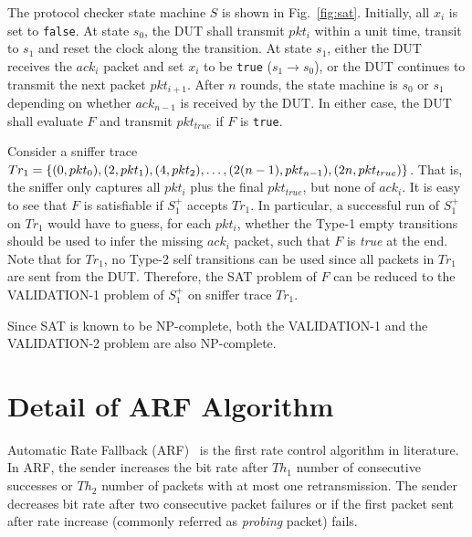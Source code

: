 The protocol checker state machine $S$ is shown in Fig.~\ref{fig:sat}.
%
Initially, all $x_i$ is set to \texttt{false}.
%
At state $s_0$, the DUT shall transmit $pkt_i$ within a unit time, transit to
$s_1$ and reset the clock along the transition.
At state $s_1$, either the DUT receives the $ack_i$ packet and
set $x_i$ to be \texttt{true} ($s_1 \rightarrow s_0$), or the DUT continues to
transmit the next packet $pkt_{i+1}$.
%
After $n$ rounds, the state machine is $s_0$ or $s_1$ depending on whether
$ack_{n-1}$ is received by the DUT.
%
In either case, the DUT shall evaluate $F$ and transmit $pkt_{true}$ if $F$ is
\texttt{true}.  

Consider a sniffer trace $Tr_1=\{(0, pkt_0), (2, pkt_1),\\ (4,
pkt_2),\ldots, (2(n-1), pkt_{n-1}), (2n, pkt_{true})\}$.
%
That is, the sniffer only captures all $pkt_i$ plus the final $pkt_{true}$, but none of
$ack_i$.
%
It is easy to see that $F$ is satisfiable if $S_1^+$ accepts
$Tr_1$.
%
In particular, a successful run of $S_1^+$ on $Tr_1$ would have to
guess, for each $pkt_i$, whether the Type-1 empty transitions should be used
to infer the missing $ack_i$ packet, such that $F$ is \textit{true} at the
end.
%
Note that for $Tr_1$, no Type-2 self transitions can be used since all
packets in $Tr_1$ are sent from the DUT.
%
Therefore, the SAT problem of $F$ can be reduced to the VALIDATION-1 problem
of $S^+_1$ on sniffer trace $Tr_1$.


Since SAT is known to be NP-complete, both the VALIDATION-1 and the
VALIDATION-2 problem are also NP-complete.

\section{Detail of ARF Algorithm}
Automatic Rate Fallback (ARF)~\cite{kamerman1997wavelan} is the first rate
control algorithm in literature. In ARF, the sender increases the bit rate after
$Th_1$ number of consecutive successes or $Th_2$ number of packets with at most
one retransmission. The sender decreases bit rate after two consecutive packet
failures or if the first packet sent after rate increase (commonly referred as
\textit{probing} packet) fails.

